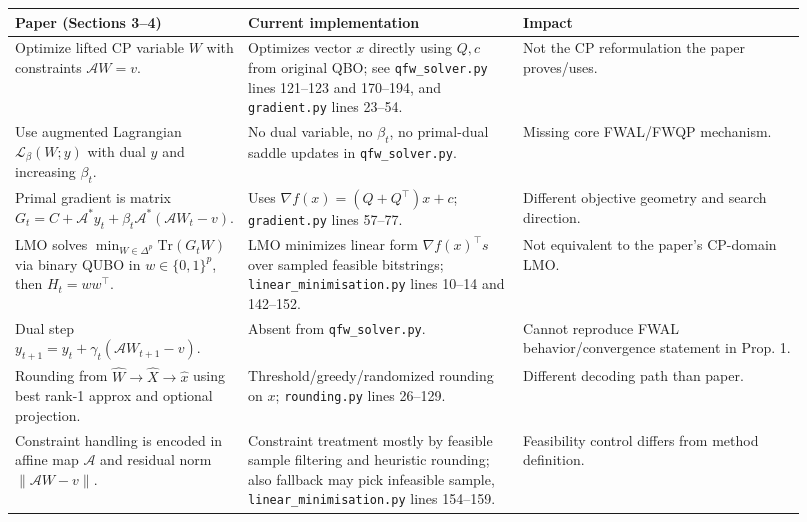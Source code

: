 \documentclass[11pt]{article}
\begin{document}
\begin{table}[h]
\centering
\small
\begin{tabular}{p{0.23\linewidth} p{0.34\linewidth} p{0.35\linewidth}}
\toprule
Paper (Sections 3--4) & Current implementation & Impact \\
\midrule
Optimize lifted CP variable $W$ with constraints $\mathcal{A}W=v$. & Optimizes vector $x$ directly using $Q,c$ from original QBO; see \texttt{qfw\_solver.py} lines 121--123 and 170--194, and \texttt{gradient.py} lines 23--54. & Not the CP reformulation the paper proves/uses. \\

Use augmented Lagrangian $\mathcal{L}_\beta(W;y)$ with dual $y$ and increasing $\beta_t$. & No dual variable, no $\beta_t$, no primal-dual saddle updates in \texttt{qfw\_solver.py}. & Missing core FWAL/FWQP mechanism. \\

Primal gradient is matrix $G_t = C + \mathcal{A}^\ast y_t + \beta_t\mathcal{A}^\ast(\mathcal{A}W_t-v)$. & Uses $\nabla f(x)=(Q+Q^\top)x+c$; \texttt{gradient.py} lines 57--77. & Different objective geometry and search direction. \\

LMO solves $\min_{W\in\Delta^p}\mathrm{Tr}(G_tW)$ via binary QUBO in $w\in\{0,1\}^p$, then $H_t=ww^\top$. & LMO minimizes linear form $\nabla f(x)^\top s$ over sampled feasible bitstrings; \texttt{linear\_minimisation.py} lines 10--14 and 142--152. & Not equivalent to the paper's CP-domain LMO. \\

Dual step $y_{t+1}=y_t+\gamma_t(\mathcal{A}W_{t+1}-v)$. & Absent from \texttt{qfw\_solver.py}. & Cannot reproduce FWAL behavior/convergence statement in Prop. 1. \\

Rounding from $\hat W\to\hat X\to\hat x$ using best rank-1 approx and optional projection. & Threshold/greedy/randomized rounding on $x$; \texttt{rounding.py} lines 26--129. & Different decoding path than paper. \\

Constraint handling is encoded in affine map $\mathcal{A}$ and residual norm $\|\mathcal{A}W-v\|$. & Constraint treatment mostly by feasible sample filtering and heuristic rounding; also fallback may pick infeasible sample, \texttt{linear\_minimisation.py} lines 154--159. & Feasibility control differs from method definition. \\
\bottomrule
\end{tabular}
\end{table}
\end{document}
